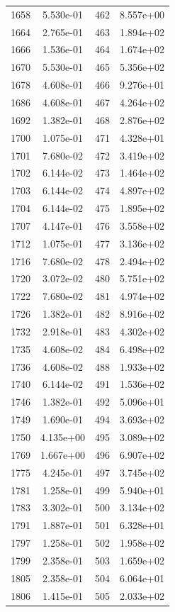 \documentclass[12pt]{article}
\begin{document}
\begin{longtable}{@{}cccc@{}}
1658 & 5.530e-01 & 462 & 8.557e+00 \\
1664 & 2.765e-01 & 463 & 1.894e+02 \\
1666 & 1.536e-01 & 464 & 1.674e+02 \\
1670 & 5.530e-01 & 465 & 5.356e+02 \\
1678 & 4.608e-01 & 466 & 9.276e+01 \\
1686 & 4.608e-01 & 467 & 4.264e+02 \\
1692 & 1.382e-01 & 468 & 2.876e+02 \\
1700 & 1.075e-01 & 471 & 4.328e+01 \\
1701 & 7.680e-02 & 472 & 3.419e+02 \\
1702 & 6.144e-02 & 473 & 1.464e+02 \\
1703 & 6.144e-02 & 474 & 4.897e+02 \\
1704 & 6.144e-02 & 475 & 1.895e+02 \\
1707 & 4.147e-01 & 476 & 3.558e+02 \\
1712 & 1.075e-01 & 477 & 3.136e+02 \\
1716 & 7.680e-02 & 478 & 2.494e+02 \\
1720 & 3.072e-02 & 480 & 5.751e+02 \\
1722 & 7.680e-02 & 481 & 4.974e+02 \\
1726 & 1.382e-01 & 482 & 8.916e+02 \\
1732 & 2.918e-01 & 483 & 4.302e+02 \\
1735 & 4.608e-02 & 484 & 6.498e+02 \\
1736 & 4.608e-02 & 488 & 1.933e+02 \\
1740 & 6.144e-02 & 491 & 1.536e+02 \\
1746 & 1.382e-01 & 492 & 5.096e+01 \\
1749 & 1.690e-01 & 494 & 3.693e+02 \\
1750 & 4.135e+00 & 495 & 3.089e+02 \\
1769 & 1.667e+00 & 496 & 6.907e+02 \\
1775 & 4.245e-01 & 497 & 3.745e+02 \\
1781 & 1.258e-01 & 499 & 5.940e+01 \\
1783 & 3.302e-01 & 500 & 3.134e+02 \\
1791 & 1.887e-01 & 501 & 6.328e+01 \\
1797 & 1.258e-01 & 502 & 1.958e+02 \\
1799 & 2.358e-01 & 503 & 1.659e+02 \\
1805 & 2.358e-01 & 504 & 6.064e+01 \\
1806 & 1.415e-01 & 505 & 2.033e+02 \\

\end{longtable}
\end{document}
